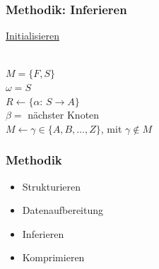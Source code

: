 \documentclass[12pt]{beamer}
\begin{document}
    \begin{frame}[allowframebreaks]
        \frametitle{Methodik: Inferieren}

        \underline{Initialisieren}\\
        ~\\
        \begin{algorithm}[H]
            $M=\{F,S\}$\\
            $\omega=S$\\
            $R \gets \{\alpha$: $S \rightarrow A\}$\\
            $\beta=$ nächster Knoten\\
            $M \gets \gamma \in \{A,B,\dots,Z\}$, mit $\gamma \notin M$\\
        \end{algorithm}

        \framebreak

        \begin{algorithm}[H]
        \end{algorithm}
    \end{frame}

    \begin{frame}
        \frametitle{Methodik}

        \begin{itemize}
            \setlength\itemsep{1em}
            \item<1-> Strukturieren
            \item<1-> Datenaufbereitung
            \item<1-> Inferieren
            \item<2-> Komprimieren
        \end{itemize}
    \end{frame}
\end{document}
